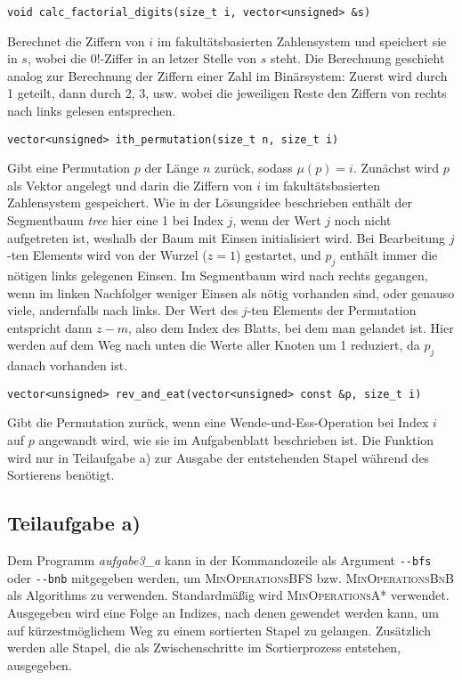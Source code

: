 \documentclass[a4paper, 10pt, ngerman]{article}
\begin{document}
\noindent \verb|void calc_factorial_digits(size_t i, vector<unsigned> &s)|
\smallskip

\noindent Berechnet die Ziffern von $i$ im fakultätsbasierten Zahlensystem und speichert sie in $s$, wobei die $0!$-Ziffer in an letzer Stelle von $s$ steht. Die Berechnung geschieht analog zur Berechnung der Ziffern einer Zahl im Binärsystem: Zuerst wird durch 1 geteilt, dann durch 2, 3, usw. wobei die jeweiligen Reste den Ziffern von rechts nach links gelesen entsprechen.
\bigskip

\noindent \verb|vector<unsigned> ith_permutation(size_t n, size_t i)|
\smallskip

\noindent Gibt eine Permutation $p$ der Länge $n$ zurück, sodass $\mu(p) = i$. Zunächst wird $p$ als Vektor angelegt und darin die Ziffern von $i$ im fakultätsbasierten Zahlensystem gespeichert. Wie in der Lösungsidee beschrieben enthält der Segmentbaum \emph{tree} hier eine 1 bei Index $j$, wenn der Wert $j$ noch nicht aufgetreten ist, weshalb der Baum mit Einsen initialisiert wird. Bei Bearbeitung $j$-ten Elements wird von der Wurzel ($z = 1$) gestartet, und $p_j$ enthält immer die nötigen links gelegenen Einsen. Im Segmentbaum wird nach rechts gegangen, wenn im linken Nachfolger weniger Einsen als nötig vorhanden sind, oder genauso viele, andernfalls nach links. Der Wert des $j$-ten Elements der Permutation entspricht dann $z - m$, also dem Index des Blatts, bei dem man gelandet ist. Hier werden auf dem Weg nach unten die Werte aller Knoten um 1 reduziert, da $p_j$ danach vorhanden ist.
\bigskip

\noindent \verb|vector<unsigned> rev_and_eat(vector<unsigned> const &p, size_t i)|
\smallskip

\noindent Gibt die Permutation zurück, wenn eine Wende-und-Ess-Operation bei Index $i$ auf $p$ angewandt wird, wie sie im Aufgabenblatt beschrieben ist. Die Funktion wird nur in Teilaufgabe a) zur Ausgabe der entstehenden Stapel während des Sortierens benötigt.

\subsection{Teilaufgabe a)}

Dem Programm \emph{aufgabe3\_a} kann in der Kommandozeile als Argument \verb|--bfs| oder \verb|--bnb| mitgegeben werden, um \textsc{MinOperationsBFS} bzw. \textsc{MinOperationsBnB} als Algorithms zu verwenden. Standardmäßig wird \textsc{MinOperationsA*} verwendet. Ausgegeben wird eine Folge an Indizes, nach denen gewendet werden kann, um auf kürzestmöglichem Weg zu einem sortierten Stapel zu gelangen. Zusätzlich werden alle Stapel, die als Zwischenschritte im Sortierprozess entstehen, ausgegeben.
\bigskip
\end{document}
